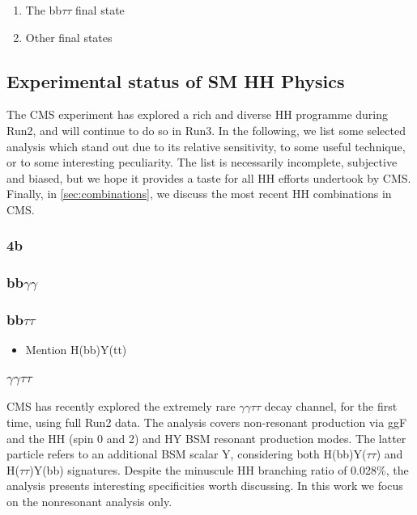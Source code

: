 \documentclass[11pt]{article}
\begin{document}
\begin{enumerate}
\item The bb\(\tau \tau\) final state
\label{sec:org5b39f4a}

\item Other final states
\label{sec:org43e8fd7}
\end{enumerate}

\subsection{Experimental status of SM HH Physics}
\label{sec:orgd072fac}
The \ac{CMS} experiment has explored a rich and diverse HH programme during Run2, and will continue to do so in Run3.
In the following, we list some selected analysis which stand out due to its relative sensitivity, to some useful technique, or to some interesting peculiarity.
The list is necessarily incomplete, subjective and biased, but we hope it provides a taste for all HH efforts undertook by \ac{CMS}.
Finally, in \cref{sec:combinations}, we discuss the most recent HH combinations in \ac{CMS}.

\subsubsection{4b}
\label{sec:org9c57037}
\label{sec:bbbb}
\subsubsection{bb\(\gamma \gamma\)}
\label{sec:org66b42a3}
\label{sec::bbgg}
\subsubsection{bb\(\tau \tau\)}
\label{sec:org1b82ad6}
\label{sec::bbtautau}


\begin{itemize}
\item Mention H(bb)Y(tt)
\end{itemize}
\subsubsection{\(\gamma \gamma \tau \tau\)}
\label{sec:orgc48fe83}
\ac{CMS} has recently explored the extremely rare \(\gamma \gamma \tau \tau\) decay channel, for the first time, using full Run2 data.
The analysis covers non-resonant production via \ac{ggF} and the HH (spin 0 and 2) and HY \ac{BSM} resonant production modes.
The latter particle refers to an additional BSM scalar Y, considering both H(bb)Y(\(\tau \tau\)) and H(\(\tau \tau\))Y(bb) signatures.
Despite the minuscule HH branching ratio of 0.028\%, the analysis presents interesting specificities worth discussing.
In this work we focus on the nonresonant analysis only.
\end{document}
